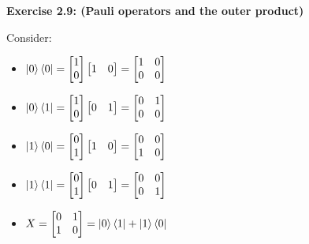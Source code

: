 \documentclass{article}
\begin{document}
\begin{framed}
    \noindent \textbf{Exercise 2.9: (Pauli operators and the outer product)}
    
    \medskip

    Consider:
    \begin{itemize}
        \item $\ket{0}\bra{0} = \begin{bmatrix}1 \\ 0\end{bmatrix}\begin{bmatrix}1 & 0\end{bmatrix} = \begin{bmatrix}1 & 0\\ 0 & 0\end{bmatrix}$
        \item $\ket{0}\bra{1} = \begin{bmatrix}1 \\ 0\end{bmatrix}\begin{bmatrix}0 & 1\end{bmatrix} = \begin{bmatrix}0 & 1\\ 0 & 0\end{bmatrix}$
        \item $\ket{1}\bra{0} = \begin{bmatrix}0 \\ 1\end{bmatrix}\begin{bmatrix}1 & 0\end{bmatrix} = \begin{bmatrix}0 & 0\\ 1 & 0\end{bmatrix}$
        \item $\ket{1}\bra{1} = \begin{bmatrix}0 \\ 1\end{bmatrix}\begin{bmatrix}0 & 1\end{bmatrix} = \begin{bmatrix}0 & 0\\ 0 & 1\end{bmatrix}$
    \end{itemize}
    \begin{itemize}
        \item $X = \begin{bmatrix}0 & 1 \\ 1 & 0\end{bmatrix} = \ket{0}\bra{1} + \ket{1}\bra{0}$

\end{itemize}
\end{framed}
\end{document}
